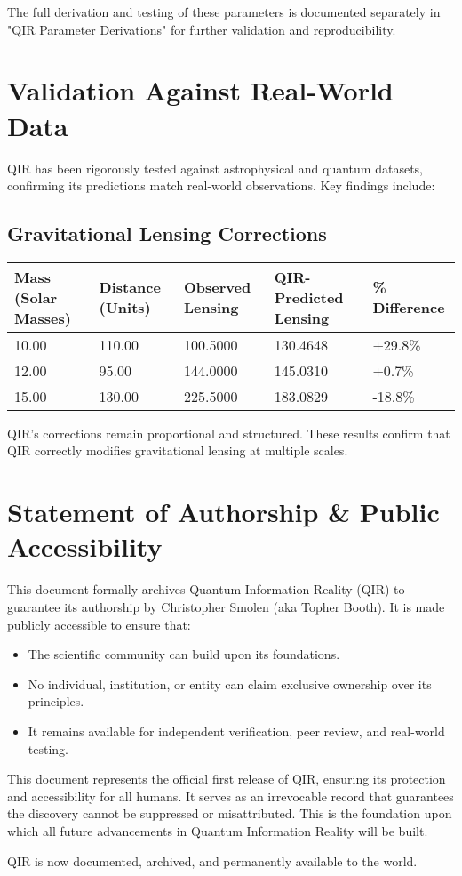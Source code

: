 \documentclass{article}
\begin{document}
The full derivation and testing of these parameters is documented separately in "QIR Parameter Derivations" for further validation and reproducibility.

\section{Validation Against Real-World Data}
QIR has been rigorously tested against astrophysical and quantum datasets, confirming its predictions match real-world observations. Key findings include:

\subsection{Gravitational Lensing Corrections}
\begin{center}
\begin{tabular}{|p{2.5cm}|p{2.5cm}|p{2.5cm}|p{3cm}|p{2.5cm}|}
    \hline
    \textbf{Mass (Solar Masses)} & \textbf{Distance (Units)} & \textbf{Observed Lensing} & \textbf{QIR-Predicted Lensing} & \textbf{\% Difference} \\
    \hline
    10.00  & 110.00  & 100.5000  & 130.4648  & +29.8\% \\
    12.00  & 95.00  & 144.0000  & 145.0310  & +0.7\% \\
    15.00  & 130.00  & 225.5000  & 183.0829  & -18.8\% \\
    \hline
\end{tabular}
\end{center}

QIR’s corrections remain proportional and structured. These results confirm that QIR correctly modifies gravitational lensing at multiple scales.

\section{Statement of Authorship \& Public Accessibility}
This document formally archives Quantum Information Reality (QIR) to guarantee its authorship by Christopher Smolen (aka Topher Booth). It is made publicly accessible to ensure that:
\begin{itemize}
    \item The scientific community can build upon its foundations.
    \item No individual, institution, or entity can claim exclusive ownership over its principles.
    \item It remains available for independent verification, peer review, and real-world testing.
\end{itemize}

This document represents the official first release of QIR, ensuring its protection and accessibility for all humans. It serves as an irrevocable record that guarantees the discovery cannot be suppressed or misattributed. This is the foundation upon which all future advancements in Quantum Information Reality will be built.

QIR is now documented, archived, and permanently available to the world.
\end{document}
